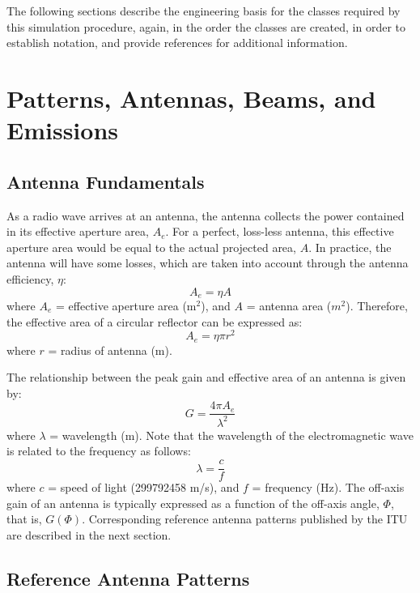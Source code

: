 \documentclass[11pt]{article}
\begin{document}
The following sections describe the engineering basis for the classes
required by this simulation procedure, again, in the order the classes
are created, in order to establish notation, and provide
references for additional information.

\section{Patterns, Antennas, Beams, and Emissions}

\subsection{Antenna Fundamentals}

As a radio wave arrives at an antenna, the antenna collects the power
contained in its effective aperture area, $A_e$.  For a perfect,
loss-less antenna, this effective aperture area would be equal to the
actual projected area, $A$.  In practice, the antenna will have some
losses, which are taken into account through the antenna efficiency,
$\eta$:
\begin{equation}
  A_e = \eta A
\end{equation}
where $A_e$ = effective aperture area (m$^2$), and $A$ = antenna area
($m^2$). Therefore, the effective area of a circular reflector can be
expressed as:
\begin{equation}
  A_e = \eta\pi r^2
\end{equation}
where $r$ = radius of antenna (m).

The relationship between the peak gain and effective area of an
antenna is given by:
\begin{equation}
  G = \frac{4\pi A_e}{\lambda^2}
\end{equation}
where $\lambda$ = wavelength (m). Note that the wavelength of the
electromagnetic wave is related to the frequency as follows:
\begin{equation}
  \lambda = \frac{c}{f}
\end{equation}
where $c$ = speed of light (299792458 m/s), and $f$ = frequency (Hz).
The off-axis gain of an antenna is typically expressed as a function
of the off-axis angle, $\Phi$, that is, $G(\Phi)$. Corresponding
reference antenna patterns published by the ITU are described in the
next section.

\subsection{Reference Antenna Patterns}
\end{document}
